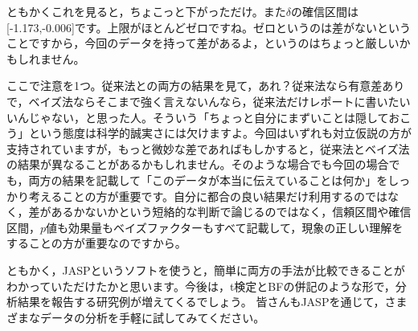\documentclass{ltjbook}
\begin{document}
ともかくこれを見ると，ちょこっと下がっただけ。また$\delta$の確信区間は[-1.173,-0.006]です。上限がほとんどゼロですね。ゼロというのは差がないということですから，今回のデータを持って差があるよ，というのはちょっと厳しいかもしれません。

ここで注意を1つ。従来法との両方の結果を見て，あれ？従来法なら有意差ありで，ベイズ法ならそこまで強く言えないんなら，従来法だけレポートに書いたいいんじゃない，と思った人。そういう「ちょっと自分にまずいことは隠しておこう」という態度は科学的誠実さには欠けますよ。今回はいずれも対立仮説の方が支持されていますが，もっと微妙な差であればもしかすると，従来法とベイズ法の結果が異なることがあるかもしれません。そのような場合でも今回の場合でも，両方の結果を記載して「このデータが本当に伝えていることは何か」をしっかり考えることの方が重要です。自分に都合の良い結果だけ利用するのではなく，差があるかないかという短絡的な判断で論じるのではなく，信頼区間や確信区間，$p$値も効果量もベイズファクターもすべて記載して，現象の正しい理解をすることの方が重要なのですから。


ともかく，JASPというソフトを使うと，簡単に両方の手法が比較できることがわかっていただけたかと思います。今後は，t検定とBFの併記のような形で，分析結果を報告する研究例が増えてくるでしょう。
皆さんもJASPを通じて，さまざまなデータの分析を手軽に試してみてください。
\end{document}
